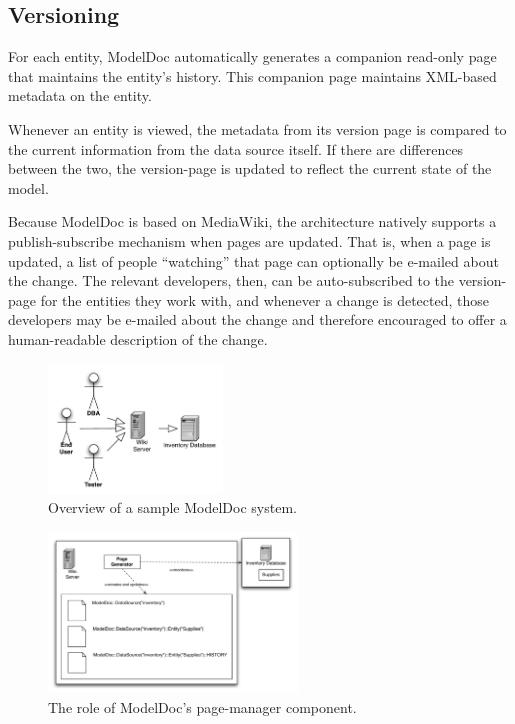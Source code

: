 \documentclass[nocopyrightspace]{acm_proc_article-sp}
\begin{document}
\subsection{Versioning}

For each entity, ModelDoc automatically generates a companion read-only page
that maintains the entity's history.  This companion page maintains XML-based
metadata on the entity.

Whenever an entity is viewed, the metadata from its version page is compared to
the current information from the data source itself.  If there are differences
between the two, the version-page is updated to reflect the current state of
the model.

Because ModelDoc is based on MediaWiki, the architecture natively supports a
publish-subscribe mechanism when pages are updated.  That is, when a page is
updated, a list of people ``watching'' that page can optionally be e-mailed
about the change.  The relevant developers, then, can be auto-subscribed to the
version-page for the entities they work with, and whenever a change is
detected, those developers may be e-mailed about the change and therefore
encouraged to offer a human-readable description of the change.

\begin{figure}[htbp]
\centering
\includegraphics[width=175px]{Overview.pdf}
\caption{Overview of a sample ModelDoc system.}
\end{figure}

\begin{figure}[htbp]
\centering
\includegraphics[width=250px]{PageManager.pdf}
\caption{The role of ModelDoc's page-manager component.}
\end{figure}
\end{document}
